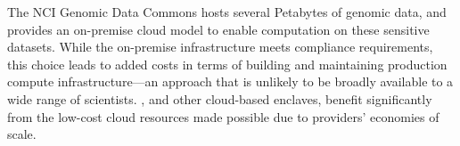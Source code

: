 The NCI Genomic Data Commons \cite{grossman2016toward} hosts several Petabytes of
genomic data, and provides an on-premise cloud model to enable computation on these sensitive datasets.
While the on-premise infrastructure meets compliance requirements, this choice leads to added costs in terms of
building and maintaining production compute infrastructure---an approach that is unlikely to be 
broadly available to a wide range of scientists. \NAMENS, and other cloud-based enclaves, benefit
significantly from the low-cost cloud resources made possible due to providers' economies of scale.




